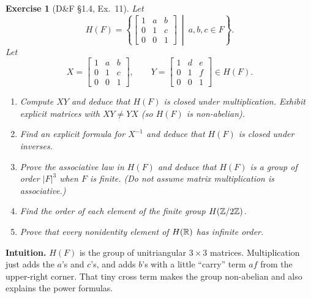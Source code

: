 \documentclass[12pt]{article}
\newtheorem{exercise}[theorem]{Exercise}
\theoremstyle{definition}
\begin{document}
\begin{exercise}[D\&F §1.4, Ex.~11]
Let
\[
H(F)=\left\{\begin{bmatrix}1&a&b\\[2pt]0&1&c\\[2pt]0&0&1\end{bmatrix}\ \middle|\ a,b,c\in F\right\}.
\]
Let
\[
X=\begin{bmatrix}1&a&b\\[2pt]0&1&c\\[2pt]0&0&1\end{bmatrix},\qquad
Y=\begin{bmatrix}1&d&e\\[2pt]0&1&f\\[2pt]0&0&1\end{bmatrix}\in H(F).
\]
\begin{enumerate}
\item[(a)] Compute $XY$ and deduce that $H(F)$ is closed under multiplication. Exhibit explicit matrices with $XY\ne YX$ (so $H(F)$ is non-abelian).
\item[(b)] Find an explicit formula for $X^{-1}$ and deduce that $H(F)$ is closed under inverses.
\item[(c)] Prove the associative law in $H(F)$ and deduce that $H(F)$ is a group of order $|F|^{3}$ when $F$ is finite. (Do not assume matrix multiplication is associative.)
\item[(d)] Find the order of each element of the finite group $H(\Bbb Z/2\Bbb Z)$.
\item[(e)] Prove that every nonidentity element of $H(\Bbb R)$ has infinite order.
\end{enumerate}
\end{exercise}

\dotfill

\noindent\textbf{Intuition.}
$H(F)$ is the group of unitriangular $3\times3$ matrices. Multiplication just adds the
$a$’s and $c$’s, and adds $b$’s with a little “carry” term $a f$ from the upper-right corner.
That tiny cross term makes the group non-abelian and also explains the power formulas.

\dotfill
\end{document}
